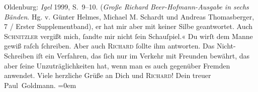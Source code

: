 \begin{ledgroupsized}[t]{13cm}
{{{                     Oldenburg: \emph{Igel}{ }1999, S. 9–10. (\emph{Große Richard
                        Beer-Hofmann-Ausgabe in sechs Bänden}. Hg. v. Günter Helmes, Michael
                     M. Schardt und Andreas Thomasberger, 7 / Erster Supplementband)}}}\label{K_L02800-21h},
               er hat mir aber mit keiner Silbe geantwortet. Auch \textsc{Schnitzler} vergißt mich, ſandte mir nicht ſein Schauſpiel.«\pend
           \pstart
           {\pb}Du wirſt dem Manne gewiß raſch ſchreiben. Aber auch \textsc{Richard} ſollte ihm antworten. Das Nicht-Schreiben iſt ein Verfahren, das ſich nur im
               Verkehr mit Freunden bewährt, das aber ſeine Unzuträglichkeiten hat, wenn man es auch
               gegenüber Fremden  anwendet.\pend
           \pstart
           Viele herzliche Grüße an Dich und \textsc{Richard}!\pend
           \pstart
           Dein treuer {\\[\baselineskip]}\spacefill\mbox{Paul Goldmann.}\pend
           \leftskip=0em{}
         
         \endnumbering{}\end{ledgroupsized}  \newcommand{\dateiname}{L02800}\newcommand{\titel}{Paul Goldmann an Arthur Schnitzler, 8. 1. [1897]}\newcommand{\editorInnen}{Martin Anton Müller und Laura Untner}
      